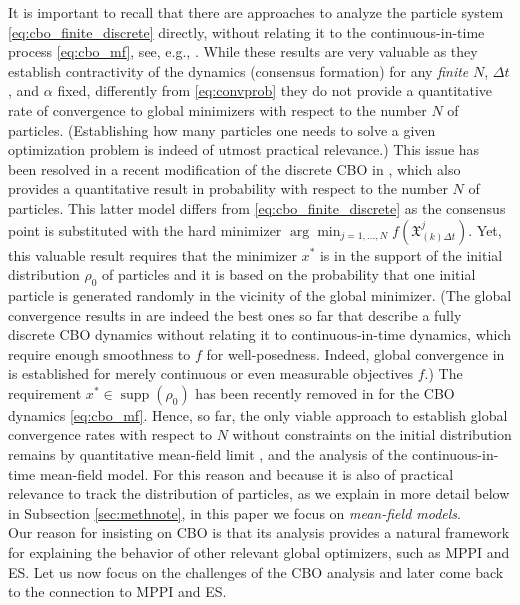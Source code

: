 \documentclass[reqno]{amsart}
\numberwithin{algorithm}{section}
\newcommand{\Xf}{{\mathfrak{X}}}
\begin{document}
{It is important to recall that there are approaches to analyze the particle system \eqref{eq:cbo_finite_discrete} directly, without relating it to the continuous-in-time process \eqref{eq:cbo_mf}, see, e.g., \cite{kim2020stochastic,ko2022convergence,gottlich2025exponential}. While these results are very valuable as they establish contractivity of the dynamics (consensus formation) for any {\it finite} $N$, $\Delta t$, and $\alpha$  fixed, differently from \eqref{eq:convprob} they do not provide a quantitative rate of convergence to global minimizers with respect to the number $N$ of particles. (Establishing how many particles one needs to solve a given optimization problem is indeed of utmost practical relevance.) 
This issue has been resolved in a recent modification of the discrete CBO in \cite{byeon2024}, which also provides a quantitative result in probability with respect to the number $N$ of particles. This latter model differs from \eqref{eq:cbo_finite_discrete} as the consensus point is substituted with the hard minimizer $\arg \min_{j=1,\dots,N} f(\Xf_{(k)\Delta t}^j)$. Yet, this valuable result requires that the minimizer $x^*$ is in the support of the initial distribution $\rho_0$ of particles and it is based on the probability that one initial particle is generated randomly in the vicinity of the global minimizer. (The global convergence results in \cite{byeon2024} are indeed the best ones so far that describe a fully discrete CBO dynamics without relating it to continuous-in-time dynamics, which require enough smoothness to $f$ for well-posedness. Indeed, global convergence in \cite{byeon2024} is established for merely continuous or even measurable objectives $f$.) The requirement $x^* \in \operatorname{supp}(\rho_0)$ has been recently removed in \cite{fornasier2025regularity} for the CBO dynamics \eqref{eq:cbo_mf}. Hence, so far,  the only viable approach to establish global convergence rates with respect to $N$ without constraints on the initial distribution remains by quantitative mean-field limit \cite[Proposition 3.11]{B1-fornasier2021global}, \cite[Theorem 2.6]{gerber_mean-field_2024} and the analysis of the continuous-in-time mean-field model. For this reason and because it is also of practical relevance to track the distribution of particles, as we explain in more detail below in Subsection \ref{sec:methnote}, in this paper we focus on {\it mean-field models}.
\\

Our reason for insisting on CBO is that its analysis provides a natural framework for explaining the behavior of other relevant global optimizers, such as MPPI and ES. Let us now focus on the challenges of the CBO analysis and later come back to the connection to MPPI and ES.


}
\end{document}
